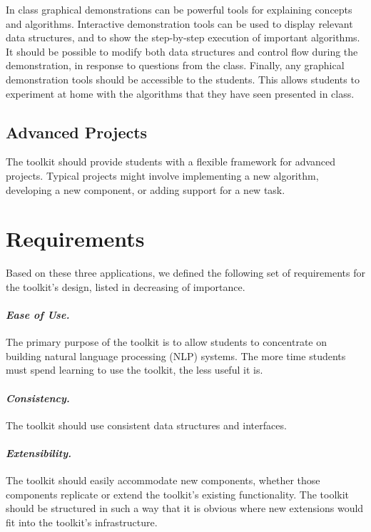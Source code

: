 \documentclass{article}
\begin{document}
In class graphical demonstrations can be powerful tools for explaining
concepts and algorithms.  Interactive demonstration tools can be used
to display relevant data structures, and to show the step-by-step
execution of important algorithms.  It should be possible to modify
both data structures and control flow during the demonstration, in
response to questions from the class.  Finally, any graphical
demonstration tools should be accessible to the students.  This allows
students to experiment at home with the algorithms that they have seen
presented in class.

\subsection{Advanced Projects}

The toolkit should provide students with a flexible framework for
advanced projects.  Typical projects might involve implementing a new
algorithm, developing a new component, or adding support for a new
task.

\section{Requirements}

Based on these three applications, we defined the following set of
requirements for the toolkit's design, listed in decreasing of 
importance.

\paragraph{\textit{Ease of Use.}} The primary purpose of the toolkit is
to allow students to concentrate on building natural language
processing (NLP) systems.  The more time students must spend learning
to use the toolkit, the less useful it is.

\paragraph{\textit{Consistency.}} The toolkit should use consistent data
structures and interfaces.

\paragraph{\textit{Extensibility.}} The toolkit should easily
accommodate new components, whether those components replicate or
extend the toolkit's existing functionality.  The toolkit should be
structured in such a way that it is obvious where new extensions would
fit into the toolkit's infrastructure.
\end{document}
